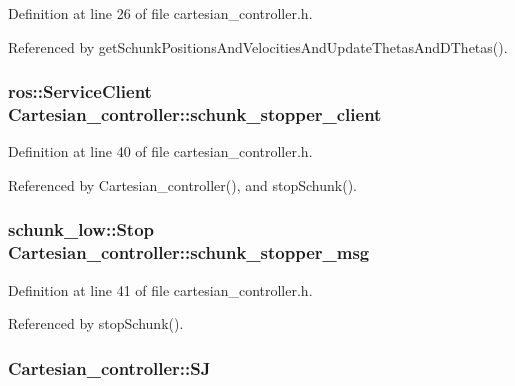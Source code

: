 Definition at line 26 of file cartesian\-\_\-controller.\-h.



Referenced by get\-Schunk\-Positions\-And\-Velocities\-And\-Update\-Thetas\-And\-D\-Thetas().

\hypertarget{classCartesian__controller_a4ea7350e0f797c49bc51d3433a761aff}{
\subsubsection[{schunk\-\_\-stopper\-\_\-client}]{\setlength{\rightskip}{0pt plus 5cm}ros\-::\-Service\-Client Cartesian\-\_\-controller\-::schunk\-\_\-stopper\-\_\-client\hspace{0.3cm}{\ttfamily [protected]}}}\label{classCartesian__controller_a4ea7350e0f797c49bc51d3433a761aff}


Definition at line 40 of file cartesian\-\_\-controller.\-h.



Referenced by Cartesian\-\_\-controller(), and stop\-Schunk().

\hypertarget{classCartesian__controller_a29581ed2f2d8bb97c55e16868bbcc8bd}{
\subsubsection[{schunk\-\_\-stopper\-\_\-msg}]{\setlength{\rightskip}{0pt plus 5cm}schunk\-\_\-low\-::\-Stop Cartesian\-\_\-controller\-::schunk\-\_\-stopper\-\_\-msg\hspace{0.3cm}{\ttfamily [protected]}}}\label{classCartesian__controller_a29581ed2f2d8bb97c55e16868bbcc8bd}


Definition at line 41 of file cartesian\-\_\-controller.\-h.



Referenced by stop\-Schunk().

\hypertarget{classCartesian__controller_a98fdac06d136ac3dba0102d97cd5dd36}{
\subsubsection[{S\-J}]{ Cartesian\-\_\-controller\-::\-S\-J\hspace{0.3cm}{\ttfamily [protected]}}}\label{classCartesian__controller_a98fdac06d136ac3dba0102d97cd5dd36}


